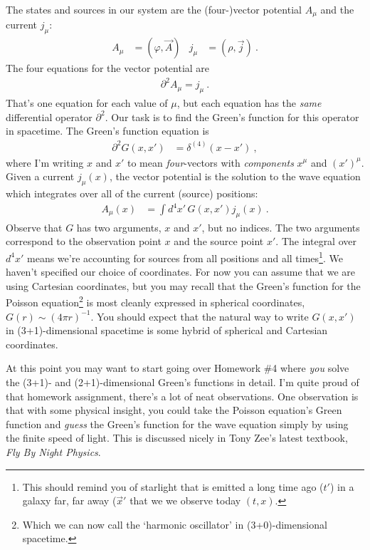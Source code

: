The states and sources in our system are the (four-)vector potential $A_\mu$ and the current $j_\mu$: 
\begin{align}
	A_\mu &= (\varphi, \vec{A})
	&
	j_\mu &= (\rho, \vec{j}) \ .
\end{align}
The four equations for the vector potential are
\begin{align}
	\partial^2 A_\mu = j_\mu \ .
\end{align}
That's one equation for each value of $\mu$, but each equation has the \emph{same} differential operator $\partial^2$. Our task is to find the Green's function for this operator in spacetime. The Green's function equation is
\begin{align}
	\partial^2 G(x,x') &= \delta^{(4)}(x-x') \ ,
	\label{eq:wave:eq:Greens:eq}
\end{align}
where I'm writing $x$ and $x'$ to mean \emph{four}-vectors with \emph{components} $x^\mu$ and $(x')^\mu$. Given a current $j_\mu(x)$, the vector potential is the solution to the wave equation which integrates over all of the current (source) positions:
\begin{align}
	A_\mu(x) &= \int d^4x' \, G(x,x') j_\mu(x) \ .
\end{align}
Observe that $G$ has two arguments, $x$ and $x'$, but no indices. The two arguments correspond to the observation point $x$ and the source point $x'$. The integral over $d^4x'$ means we're accounting for sources from all positions and all times\footnote{This should remind you of starlight that is emitted a long time ago ($t'$) in a galaxy far, far away ($\vec{x}'$ that we we observe today $(t,x)$.}. We haven't specified our choice of coordinates. For now you can assume that we are using Cartesian coordinates, but you may recall that the Green's function for the Poisson equation\footnote{Which we can now call the `harmonic oscillator' in (3+0)-dimensional spacetime.} is most cleanly expressed in spherical coordinates, $G(r)\sim (4\pi r)^{-1}$. You should expect that the natural way to write $G(x,x')$ in (3+1)-dimensional spacetime is some hybrid of spherical and Cartesian coordinates.

\begin{exercise}\label{ex:guess:Greens}
At this point you may want to start going over Homework \#4 where \emph{you} solve the (3+1)- and (2+1)-dimensional Green's functions in detail. I'm quite proud of that homework assignment, there's a lot of neat observations. One observation is that with some physical insight, you could take the Poisson equation's Green function and \emph{guess} the Green's function for the wave equation simply by using the finite speed of light. This is discussed nicely in Tony Zee's latest textbook, \emph{Fly By Night Physics}. 
\end{exercise}



